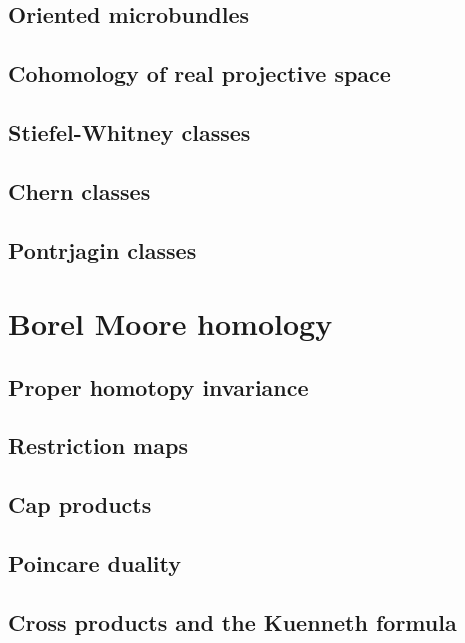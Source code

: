 \documentclass[5pt]{article}
\theoremstyle{definition}
\theoremstyle{remark}
\begin{document}
	\subsection{Oriented microbundles}
	
	\subsection{Cohomology of real projective space}
	
	\subsection{Stiefel-Whitney classes}
	
	\subsection{Chern classes}
	
	\subsection{Pontrjagin classes}
	
	\newpage	
	
	\section{Borel Moore homology}
	
	\subsection{Proper homotopy invariance}
	
	\subsection{Restriction maps}
	
	\subsection{Cap products}
	
	\subsection{Poincare duality}
	
	\subsection{Cross products and the Kuenneth formula}
	
\end{document}
